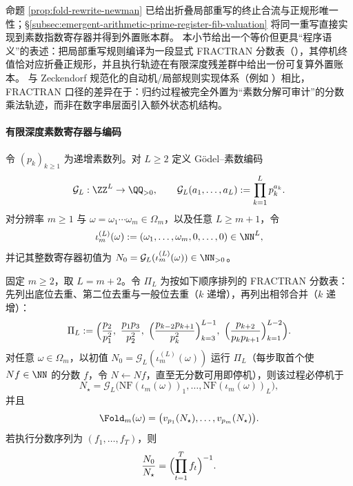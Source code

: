 \begin{remark}\label{rem:fold-fractran-context}
命题 \ref{prop:fold-rewrite-newman} 已给出折叠局部重写的终止合流与正规形唯一性；\S\ref{subsec:emergent-arithmetic-prime-register-fib-valuation} 将同一重写直接实现到素数指数寄存器并得到外置账本群。
本小节给出一个等价但更具“程序语义”的表述：把局部重写规则编译为一段显式 FRACTRAN 分数表（\cite{Conway1987FRACTRAN}），其停机终值恰对应折叠正规形，并且执行轨迹在有限深度残差群中给出一份可复算外置账本。
与 Zeckendorf 规范化的自动机/局部规则实现体系（例如 \cite{AhlbachUsatineFrougnyPippenger2013}）相比，FRACTRAN 口径的差异在于：归约过程被完全外置为“素数分解可审计”的分数乘法轨迹，而非在数字串层面引入额外状态机结构。
\end{remark}

\paragraph{有限深度素数寄存器与编码}
令 \((p_k)_{k\ge 1}\) 为递增素数列。对 \(L\ge 2\) 定义 Gödel--素数编码
\[
\mathcal G_L:\ZZ^L\to\QQ_{>0},\qquad
\mathcal G_L(a_1,\dots,a_L):=\prod_{k=1}^{L} p_k^{a_k}.
\]
对分辨率 \(m\ge 1\) 与 \(\omega=\omega_1\cdots \omega_m\in\Omega_m\)，以及任意 \(L\ge m+1\)，令
\[
\iota_m^{(L)}(\omega):=(\omega_1,\dots,\omega_m,0,\dots,0)\in\NN^L,
\]
并记其整数寄存器初值为 \(N_0=\mathcal G_L(\iota_m^{(L)}(\omega))\in\NN_{>0}\)。

\begin{theorem}\label{thm:fractran-fold-compiler}
固定 \(m\ge 2\)，取 \(L=m+2\)。令 \(\Pi_L\) 为按如下顺序排列的 FRACTRAN 分数表：先列出底位去重、第二位去重与一般位去重（\(k\) 递增），再列出相邻合并（\(k\) 递增）：
\[
\Pi_L:=
\Bigl(
\frac{p_2}{p_1^2},\ \frac{p_1p_3}{p_2^2},\
\Bigl(\frac{p_{k-2}p_{k+1}}{p_k^2}\Bigr)_{k=3}^{L-1},\
\Bigl(\frac{p_{k+2}}{p_kp_{k+1}}\Bigr)_{k=1}^{L-2}
\Bigr).
\]
对任意 \(\omega\in\Omega_m\)，以初值 \(N_0=\mathcal G_L(\iota_m^{(L)}(\omega))\) 运行 \(\Pi_L\)（每步取首个使 \(Nf\in\NN\) 的分数 \(f\)，令 \(N\leftarrow Nf\)，直至无分数可用即停机），则该过程必停机于
\[
N_\star=\mathcal G_L\!\bigl(\mathrm{NF}(\iota_m(\omega))_1,\dots,\mathrm{NF}(\iota_m(\omega))_L\bigr),
\]
并且
\[
\Fold_m(\omega)=\bigl(v_{p_1}(N_\star),\dots,v_{p_m}(N_\star)\bigr).
\]
若执行分数序列为 \((f_1,\dots,f_T)\)，则
\[
\frac{N_0}{N_\star}=\Bigl(\prod_{t=1}^{T} f_t\Bigr)^{-1}.
\]
\end{theorem}

